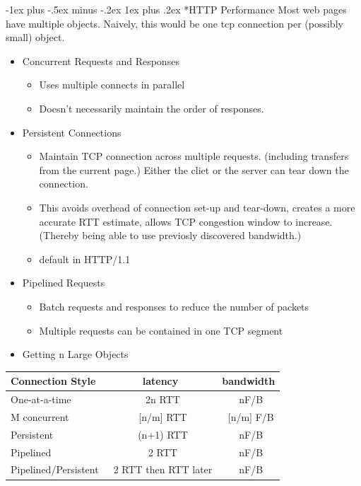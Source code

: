 \documentclass[3pt,landscape]{article}
\makeatletter
\renewcommand{\subsubsection}{\@startsection{subsubsection}{3}{0mm}%
                            {-1ex plus -.5ex minus -.2ex}%
                            {1ex plus .2ex}%
                            {\normalfont\small\bfseries}}
\makeatother
\begin{document}
\begin{multicols}{3}
\subsubsection*{HTTP Performance}
Most web pages have multiple objects. Naively, this would be one tcp connection per (possibly small) object.
\begin{itemize}
    \item Concurrent Requests and Responses
        \begin{itemize}
            \item Uses multiple connects in parallel
            \item Doesn't necessarily maintain the order of responses.
        \end{itemize}
    \item Persistent Connections
        \begin{itemize}
            \item Maintain TCP connection across multiple requests. (including transfers from the current page.) Either the cliet or the server can tear down the connection.
            \item This avoids overhead of connection set-up and tear-down, creates a more accurate RTT estimate, allows TCP congestion window to increase. (Thereby being able to use previosly discovered bandwidth.)
            \item default in HTTP/1.1
        \end{itemize}
    \item Pipelined Requests
        \begin{itemize}
            \item Batch requests and responses to reduce the number of packets
            \item Multiple requests can be contained in one TCP segment
        \end{itemize}
    \item Getting n Large Objects
\end{itemize}
\begin{tabular}{|l|c|c|}
    \hline
    Connection Style & latency & bandwidth\\
    \hline
    \hline
    One-at-a-time & ~2n RTT & ~nF/B\\
    M concurrent & ~[n/m] RTT & ~[n/m] F/B\\
    Persistent & ~(n+1) RTT & ~nF/B\\
    Pipelined & ~2 RTT & ~nF/B\\
    Pipelined/Persistent & ~2 RTT then RTT later & ~nF/B\\

\end{tabular}
\end{multicols}
\end{document}
